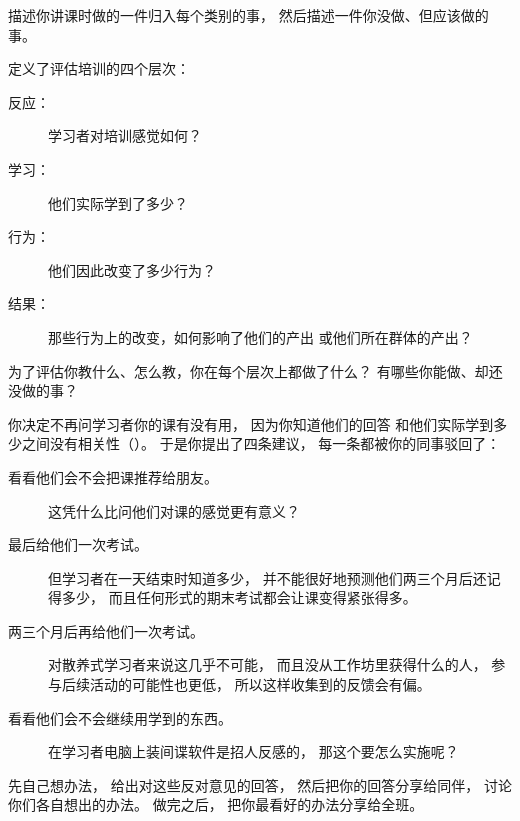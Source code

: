 描述你讲课时做的一件归入每个类别的事，
然后描述一件你没做、但应该做的事。


\cite{Kirk1994}定义了评估培训的四个层次：

\begin{description}

\item[反应：]
  学习者对培训感觉如何？

\item[学习：]
  他们实际学到了多少？

\item[行为：]
  他们因此改变了多少行为？

\item[结果：]
  那些行为上的改变，如何影响了他们的产出
  或他们所在群体的产出？

\end{description}

为了评估你教什么、怎么教，你在每个层次上都做了什么？
有哪些你能做、却还没做的事？


你决定不再问学习者你的课有没有用，
因为你知道他们的回答
和他们实际学到多少之间没有相关性（）。
于是你提出了四条建议，
每一条都被你的同事驳回了：

\begin{description}

\item[看看他们会不会把课推荐给朋友。]
  这凭什么比问他们对课的感觉更有意义？

\item[最后给他们一次考试。]
  但学习者在一天结束时知道多少，
  并不能很好地预测他们两三个月后还记得多少，
  而且任何形式的期末考试都会让课变得紧张得多。

\item[两三个月后再给他们一次考试。]
  对散养式学习者来说这几乎不可能，
  而且没从工作坊里获得什么的人，
  参与后续活动的可能性也更低，
  所以这样收集到的反馈会有偏。

\item[看看他们会不会继续用学到的东西。]
  在学习者电脑上装间谍软件是招人反感的，
  那这个要怎么实施呢？

\end{description}

先自己想办法，
给出对这些反对意见的回答，
然后把你的回答分享给同伴，
讨论你们各自想出的办法。
做完之后，
把你最看好的办法分享给全班。
